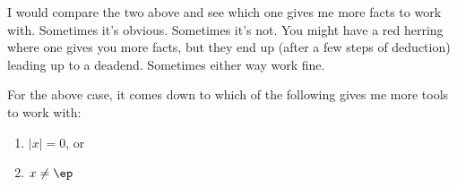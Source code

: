 I would compare the two above and see which one gives me more
facts to work with.
Sometimes it's obvious.
Sometimes it's not.
You might have a red herring where one gives you more facts, but
they end up (after a few steps of deduction) leading up to a deadend.
Sometimes either way work fine.

For the above case, it comes down to which of the following gives me
more tools to work with:
\begin{enumerate}
\item $|x| = 0$, or
\item $x \neq \ep$
\end{enumerate}

